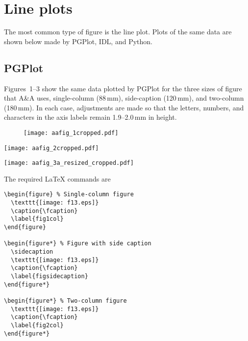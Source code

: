 \documentclass[traditabstract]{aa}
\begin{document}
\section{Line plots}

The most common type of figure is the line plot.  Plots of the same data are shown below made by PGPlot, IDL, and Python.  





\subsection{PGPlot}

Figures~1--3 show the same data plotted by PGPlot for the three sizes of figure that A\&A uses, single-column (88\,mm), side-caption (120\,mm), and two-column (180\,mm).  In each case, adjustments are made so that the letters, numbers, and characters in the axis labels remain 1.9--2.0\,mm in height.



\begin{figure} 
  \texttt{[image: aafig\_1cropped.pdf]}
  \caption{\fcaption} 
  \label{fig1col}
\end{figure}



\begin{figure*} 
  \sidecaption
  \texttt{[image: aafig\_2cropped.pdf]} 
  \caption{\fcaption} 
  \label{figsidecaption}
\end{figure*}



\begin{figure*} 
  \texttt{[image: aafig\_3a\_resized\_cropped.pdf]}
  \caption{\fcaption} 
  \label{fig2col}
\end{figure*}

The required LaTeX commands are

\begin{verbatim}
\begin{figure} % Single-column figure
  \texttt{[image: f13.eps]}
  \caption{\fcaption} 
  \label{fig1col}
\end{figure}

\begin{figure*} % Figure with side caption
  \sidecaption
  \texttt{[image: f13.eps]} 
  \caption{\fcaption} 
  \label{figsidecaption}
\end{figure*}

\begin{figure*} % Two-column figure
  \texttt{[image: f13.eps]}
  \caption{\fcaption} 
  \label{fig2col}
\end{figure*}
\end{verbatim}
\end{document}
